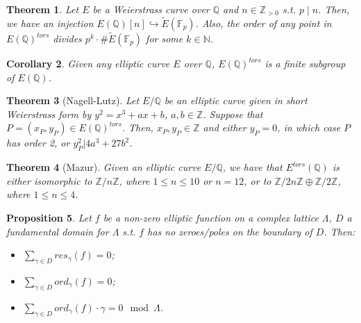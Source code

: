 \documentclass{article}
\newcommand{\numberset}{\mathbb}
\newcommand{\N}{\numberset{N}}
\newcommand{\Z}{\numberset{Z}}
\newcommand{\Q}{\numberset{Q}}
\newcommand{\F}{\numberset{F}}
\theoremstyle{plain}
\newtheorem{thm}{Theorem}
\newtheorem{prop}[thm]{Proposition}
\newtheorem{cor}[thm]{Corollary}
\theoremstyle{definition}
\begin{document}
\begin{thm}
    Let $E$ be a Weierstrass curve over $\Q$ and $n\in\Z_{>0}$ s.t. $p\mid n$.
    Then, we have an injection $E(\Q)[n]\hookrightarrow\tilde{E}(\F_p)$. Also,
    the order of any point in $E(\Q)^{tors}$ divides
    $p^k\cdot \#\tilde{E}(\F_p)$ for some $k\in\N$.
\end{thm}

\begin{cor}
    Given any elliptic curve $E$ over $\Q$, $E(\Q)^{tors}$ is a finite subgroup
    of $E(\Q)$.
\end{cor}

\begin{thm}[Nagell-Lutz]
    Let $E/\Q$ be an elliptic curve given in short Weierstrass form by
    $y^2=x^3+ax+b$, $a,b\in\Z$. Suppose that $P=(x_P,y_P)\in E(\Q)^{tors}$.
    Then, $x_P,y_P\in\Z$ and either $y_P=0$, in which case $P$ has order 2, or
    $y_P^2|4a^3+27b^2$.
\end{thm}

\begin{thm}[Mazur]
    Given an elliptic curve $E/\Q$, we have that $E^{tors}(\Q)$ is either
    isomorphic to $\Z/n\Z$, where $1\leq n\leq 10$ or $n=12$, or to
    $\Z/2n\Z\oplus\Z/2\Z$, where $1\leq n\leq 4$.
\end{thm}

\begin{prop}
    Let $f$ be a non-zero elliptic function on a complex lattice $\Lambda$, $D$
    a fundamental domain for $\Lambda$ s.t. $f$ has no zeroes/poles on the
    boundary of $D$. Then:
    \begin{itemize}
        \item $\sum_{\gamma\in D} res_{\gamma}(f)=0$;
        \item $\sum_{\gamma\in D} ord_\gamma(f)=0$;
        \item $\sum_{\gamma\in D}ord_\gamma(f)\cdot\gamma=0\mod\Lambda$.
    \end{itemize}
\end{prop}

\printbibliography
\end{document}
